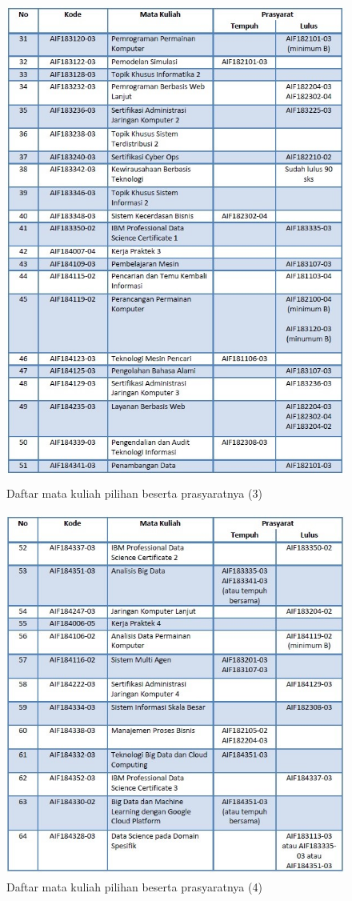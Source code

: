 \begin{figure}[H]
    \centering
    \includegraphics[width=12cm, height=16cm]{Gambar/Prasyarat MK Pilihan 3.jpg}
    \caption{Daftar mata kuliah pilihan beserta prasyaratnya (3)}
    \label{fig:gambar13}
\end{figure}

\begin{figure}[H]
    \centering
    \includegraphics[width=12cm, height=12cm]{Gambar/Prasyarat MK Pilihan 4.jpg}
    \caption{Daftar mata kuliah pilihan beserta prasyaratnya (4)}
    \label{fig:gambar14}
\end{figure}

